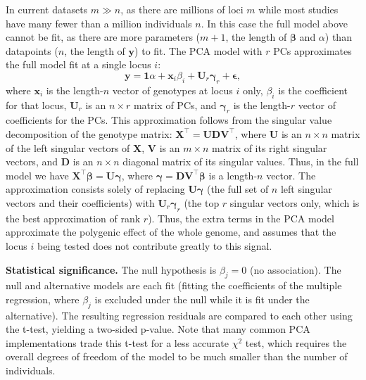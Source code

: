 \documentclass[11pt]{article}
\begin{document}
In current datasets $m \gg n$, as there are millions of loci $m$ while most studies have many fewer than a million individuals $n$.
In this case the full model above cannot be fit, as there are more parameters ($m+1$, the length of $\boldsymbol{\beta}$ and $\alpha$) than datapoints ($n$, the length of $\mathbf{y}$) to fit.
The PCA model with $r$ PCs approximates the full model fit at a single locus $i$:
\begin{equation}
  \label{eq:pca_gwas}
  \mathbf{y}
  =
  \mathbf{1} \alpha + \mathbf{x}_i \beta_i + \mathbf{U}_r \boldsymbol{\gamma}_r + \boldsymbol{\epsilon}
  ,
\end{equation}
where $\mathbf{x}_i$ is the length-$n$ vector of genotypes at locus $i$ only,
$\beta_i$ is the coefficient for that locus,
$\mathbf{U}_r$ is an $n \times r$ matrix of PCs, and
$\boldsymbol{\gamma}_r$ is the length-$r$ vector of coefficients for the PCs.
This approximation follows from the singular value decomposition of the genotype matrix:
$\mathbf{X}^\intercal = \mathbf{U} \mathbf{D} \mathbf{V}^\intercal$,
where
$\mathbf{U}$ is an $n \times n$ matrix of the left singular vectors of $\mathbf{X}$,
$\mathbf{V}$ is an $m \times n$ matrix of its right singular vectors, and
$\mathbf{D}$ is an $n \times n$ diagonal matrix of its singular values.
Thus, in the full model we have
$\mathbf{X}^\intercal \boldsymbol{\beta} = \mathbf{U} \boldsymbol{\gamma}$,
where
$\boldsymbol{\gamma} = \mathbf{D} \mathbf{V}^\intercal \boldsymbol{\beta}$ is a length-$n$ vector.
The approximation consists solely of replacing $\mathbf{U} \boldsymbol{\gamma}$ (the full set of $n$ left singular vectors and their coefficients) with $\mathbf{U}_r \boldsymbol{\gamma}_r$ (the top $r$ singular vectors only, which is the best approximation of rank $r$).
Thus, the extra terms in the PCA model approximate the polygenic effect of the whole genome, and assumes that the locus $i$ being tested does not contribute greatly to this signal.

\textbf{Statistical significance.}
The null hypothesis is $\beta_j = 0$ (no association).
The null and alternative models are each fit (fitting the coefficients of the multiple regression, where $\beta_j$ is excluded under the null while it is fit under the alternative).
The resulting regression residuals are compared to each other using the t-test, yielding a two-sided p-value.
Note that many common PCA implementations trade this t-test for a less accurate $\chi^2$ test, which requires the overall degrees of freedom of the model to be much smaller than the number of individuals.
\end{document}

